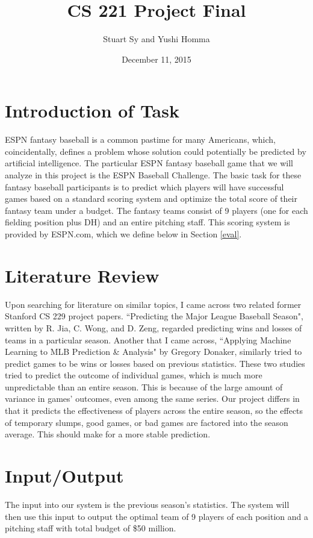 \documentclass[12pt]{amsart}
\begin{document}
\title{\large CS 221 Project Final}
\author{Stuart Sy and Yushi Homma}
\date{December 11, 2015}
\maketitle
\section{\large Introduction of Task}
\label{def}
ESPN fantasy baseball is a common pastime for many Americans, which, coincidentally, defines a problem whose solution could potentially be predicted by artificial intelligence. The particular ESPN fantasy baseball game that we will analyze in this project is the ESPN Baseball Challenge. The basic task for these fantasy baseball participants is to predict which players will have successful games based on a standard scoring system and optimize the total score of their fantasy team under a budget. The fantasy teams consist of 9 players (one for each fielding position plus DH) and an entire pitching staff. This scoring system is provided by ESPN.com, which we define below in Section \ref{eval}.

\section{\large Literature Review}
Upon searching for literature on similar topics, I came across two related former Stanford CS 229 project papers. ``Predicting the Major League Baseball Season", written by R. Jia, C. Wong, and D. Zeng, regarded predicting wins and losses of teams in a particular season. Another that I came across, ``Applying Machine Learning to MLB Prediction \& Analysis" by Gregory Donaker, similarly tried to predict games to be wins or losses based on previous statistics. These two studies tried to predict the outcome of individual games, which is much more unpredictable than an entire season. This is because of the large amount of variance in games' outcomes, even among the same series. Our project differs in that it predicts the effectiveness of players across the entire season, so the effects of temporary slumps, good games, or bad games are factored into the season average. This should make for a more stable prediction.

\section{\large Input/Output}
\label{io}
The input into our system is the previous season's statistics. The system will then use this input to output the optimal team of 9 players of each position and a pitching staff with total budget of \$50 million.
\end{document}
